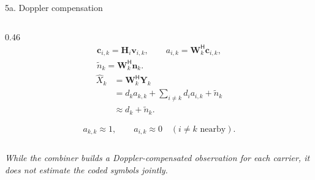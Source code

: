 \documentclass[aspectratio=169,10pt]{beamer}
\newcommand{\vY}{\bm{Y}}
\newcommand{\vc}{\bm{c}}
\newcommand{\vn}{\bm{n}}
\newcommand{\vv}{\bm{v}}
\newcommand{\vH}{\bm{H}}
\newcommand{\vW}{\bm{W}}
\newcommand{\hX}{\hat{X}}
\newcommand{\herm}{\mathsf{H}}
\begin{document}
\begin{frame}{5a. Doppler compensation}
\begin{columns}[T,onlytextwidth]
    \begin{column}{0.46\textwidth}
      \vspace{-0.6em}
      \[
      \begin{gathered}
        \vc_{i,k}=\vH_i\vv_{i,k},\qquad
        a_{i,k}=\vW_k^{\herm}\vc_{i,k},\\[-1pt]
        \tilde n_k=\vW_k^{\herm}\vn_k .
      \end{gathered}
      \]
      \vspace{-0.7em}
      \[
      \begin{aligned}
        \hX_k
        &=\vW_k^{\herm}\vY_k\\
        &=d_k a_{k,k}
          +\sum_{i\ne k} d_i a_{i,k}
          +\tilde n_k\\
        &\approx d_k+\tilde n_k .
      \end{aligned}
      \]

      \vspace{-0.6em}
      \[
        a_{k,k}\approx 1,
        \qquad
        a_{i,k}\approx 0
        \quad (i\ne k \text{ nearby}).
      \]

      \vspace{-0.1em}
      \begin{center}
      \end{center}
    \end{column}
  \end{columns}

  \vspace{0.2em}
  \begin{center}
    {\itshape\footnotesize While the combiner builds a Doppler-compensated
    observation for each carrier, it does not estimate the coded symbols jointly.}
  \end{center}

\end{frame}
\end{document}
